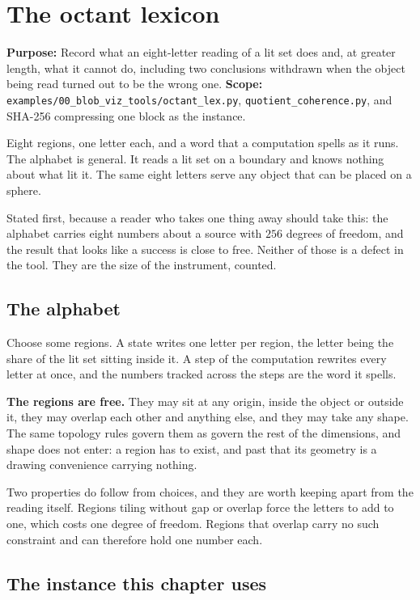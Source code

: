 \chapter{The octant lexicon}

\textbf{Purpose:} Record what an eight-letter reading of a lit set does and, at greater length, what it cannot do, including two conclusions withdrawn when the object being read turned out to be the wrong one. \textbf{Scope:} \texttt{examples/\allowbreak{}00\_blob\_viz\_tools/\allowbreak{}octant\_lex.py}, \texttt{quotient\_coherence.py}, and SHA-256 compressing one block as the instance.

Eight regions, one letter each, and a word that a computation spells as it runs. The alphabet is general. It reads a lit set on a boundary and knows nothing about what lit it. The same eight letters serve any object that can be placed on a sphere.

Stated first, because a reader who takes one thing away should take this: the alphabet carries eight numbers about a source with \(256\) degrees of freedom, and the result that looks like a success is close to free. Neither of those is a defect in the tool. They are the size of the instrument, counted.

\section{The alphabet}

Choose some regions. A state writes one letter per region, the letter being the share of the lit set sitting inside it. A step of the computation rewrites every letter at once, and the numbers tracked across the steps are the word it spells.

\textbf{The regions are free.} They may sit at any origin, inside the object or outside it, they may overlap each other and anything else, and they may take any shape. The same topology rules govern them as govern the rest of the dimensions, and shape does not enter: a region has to exist, and past that its geometry is a drawing convenience carrying nothing.

Two properties do follow from choices, and they are worth keeping apart from the reading itself. Regions tiling without gap or overlap force the letters to add to one, which costs one degree of freedom. Regions that overlap carry no such constraint and can therefore hold one number each.

\section{The instance this chapter uses}

